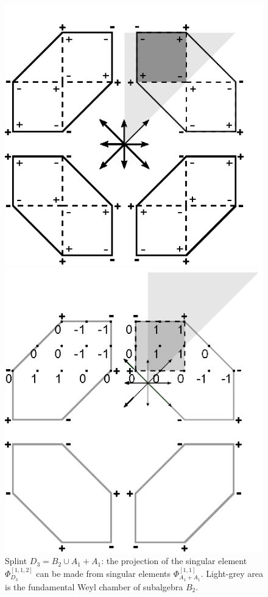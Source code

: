\documentclass[12pt]{iopart}
\begin{document}
\begin{figure}[h]
\begin{center}
\begin{minipage}[h]{0.5\linewidth}
\includegraphics[width=0.95\linewidth]{drawing-1}
\caption{Splint $D_3= B_2\cup A_1+A_1$: the projection of the singular element $\Phi_{D_3}^{[1,1,2]}$ can be made from singular elements $\Phi_{A_1+A_1}^{[1,1]}$. Light-grey area is the fundamental Weyl chamber of subalgebra $B_2$.} 
\label{ris1} 
\end{minipage}
\hfill
\begin{minipage}[h]{0.47\linewidth}
\includegraphics[width=0.9\linewidth,viewport=0 0 157 157,clip]{drawing-3}

\end{minipage}
\end{center}
\end{figure}
\end{document}
